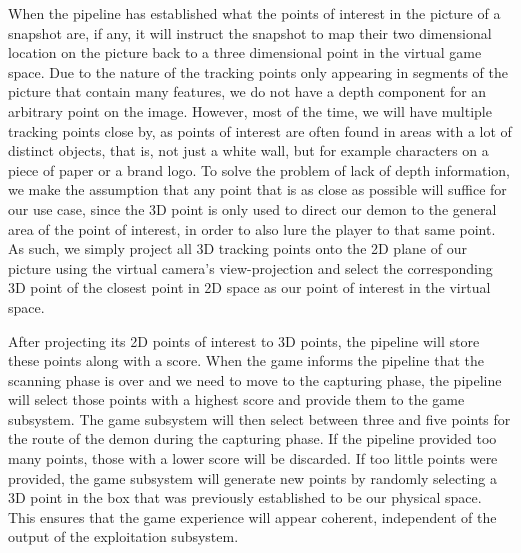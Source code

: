 When the pipeline has established what the points of interest in the picture of a snapshot are, if any, it will instruct the snapshot to map their two dimensional location on the picture back to a three dimensional point in the virtual game space.
Due to the nature of the tracking points only appearing in segments of the picture that contain many features, we do not have a depth component for an arbitrary point on the image.
However, most of the time, we will have multiple tracking points close by, as points of interest are often found in areas with a lot of distinct objects, that is, not just a white wall, but for example characters on a piece of paper or a brand logo.
To solve the problem of lack of depth information, we make the assumption that any point that is as close as possible will suffice for our use case, since the 3D point is only used to direct our demon to the general area of the point of interest, in order to also lure the player to that same point.
As such, we simply project all 3D tracking points onto the 2D plane of our picture using the virtual camera's view-projection and select the corresponding 3D point of the closest point in 2D space as our point of interest in the virtual space.

After projecting its 2D points of interest to 3D points, the pipeline will store these points along with a score.
When the game informs the pipeline that the scanning phase is over and we need to move to the capturing phase, the pipeline will select those points with a highest score and provide them to the game subsystem.
The game subsystem will then select between three and five points for the route of the demon during the capturing phase.
If the pipeline provided too many points, those with a lower score will be discarded.
If too little points were provided, the game subsystem will generate new points by randomly selecting a 3D point in the box that was previously established to be our physical space.
This ensures that the game experience will appear coherent, independent of the output of the exploitation subsystem.
